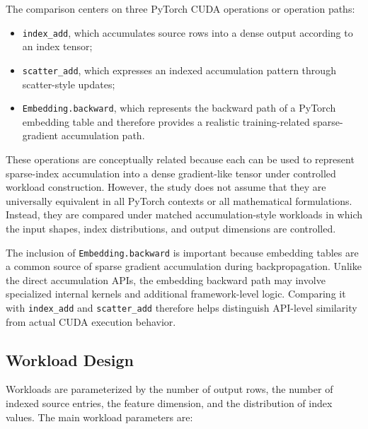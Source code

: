 The comparison centers on three PyTorch CUDA operations or operation paths:

\begin{itemize}[leftmargin=*]
    \item \texttt{index\_\allowbreak add}, which accumulates source rows into a dense output according to an index tensor;
    \item \texttt{scatter\_\allowbreak add}, which expresses an indexed accumulation pattern through scatter-style updates;
    \item \texttt{Embedding.\allowbreak backward}, which represents the backward path of a PyTorch embedding table and therefore provides a realistic training-related sparse-gradient accumulation path.
\end{itemize}

These operations are conceptually related because each can be used to represent sparse-index accumulation into a dense gradient-like tensor under controlled workload construction. However, the study does not assume that they are universally equivalent in all PyTorch contexts or all mathematical formulations. Instead, they are compared under matched accumulation-style workloads in which the input shapes, index distributions, and output dimensions are controlled.

The inclusion of \texttt{Embedding.\allowbreak backward} is important because embedding tables are a common source of sparse gradient accumulation during backpropagation. Unlike the direct accumulation APIs, the embedding backward path may involve specialized internal kernels and additional framework-level logic. Comparing it with \texttt{index\_\allowbreak add} and \texttt{scatter\_\allowbreak add} therefore helps distinguish API-level similarity from actual CUDA execution behavior.

\subsection{Workload Design}

Workloads are parameterized by the number of output rows, the number of indexed source entries, the feature dimension, and the distribution of index values. The main workload parameters are:

